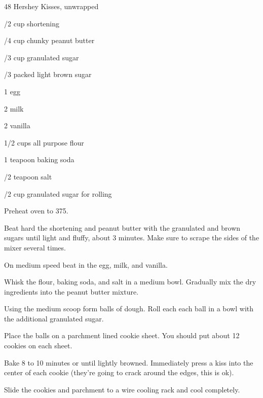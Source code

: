 %
%
%
%
\newpage



\begin{IngredientsAndSteps}
    \ListIngredientsAndSteps
    {
        48 Hershey Kisses, unwrapped

        /2 cup shortening

        /4 cup chunky peanut butter

        /3 cup granulated sugar

        /3 packed light brown sugar

        1 egg

        2 \Tbl[s] milk

        2 \tsp[s] vanilla

        1/2 cups all purpose flour

        1 teapoon baking soda

        /2 teapoon salt

        /2 cup granulated sugar for rolling
    }
    {
        Preheat oven to 375\Degrees[F].

        Beat hard the shortening and peanut butter with the granulated and brown sugars
        until light and fluffy, about 3 minutes. Make sure to scrape the sides of the
        mixer several times.

        On medium speed beat in the egg, milk, and vanilla.

        Whisk the flour, baking soda, and salt in a medium bowl. Gradually mix the dry ingredients
        into the peanut butter mixture.

        Using the medium scoop form balls of dough. Roll each each ball in a bowl with the
        additional granulated sugar.

        Place the balls on a parchment lined cookie sheet. You should put about 12 cookies
        on each sheet.

        Bake 8 to 10 minutes or until lightly browned. Immediately press a kiss into the center
        of each cookie (they're going to crack around the edges, this is ok).

        Slide the cookies and parchment to a wire cooling rack and cool completely.
    }
\end{IngredientsAndSteps}

%
%
%
%
\newpage

